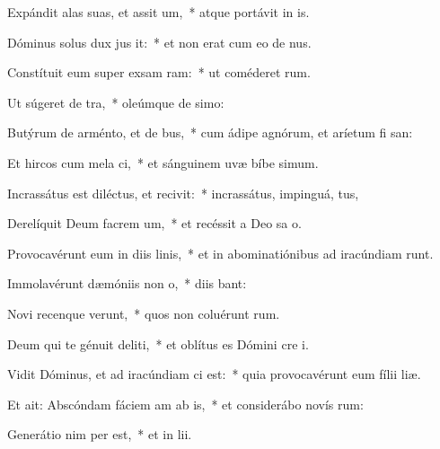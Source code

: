 \item Expándit alas suas, et assit um,~* atque portávit in  is.
\item Dóminus solus dux jus it:~* et non erat cum eo de nus.
\item Constítuit eum super exsam ram:~* ut coméderet  rum.
\item Ut súgeret  de tra,~* oleúmque de  simo:
\item Butýrum de arménto, et  de bus,~* cum ádipe agnórum, et aríetum fi san:
\item Et hircos cum mela ci,~* et sánguinem uvæ bíbe simum.
\item Incrassátus est diléctus, et recivit:~* incrassátus, impinguá, tus,
\item Derelíquit Deum facrem um,~* et recéssit a Deo sa o.
\item Provocavérunt eum in diis linis,~* et in abominatiónibus ad iracúndiam runt.
\item Immolavérunt dæmóniis  non o,~* diis  bant:
\item Novi recenque verunt,~* quos non coluérunt  rum.
\item Deum qui te génuit deliti,~* et oblítus es Dómini cre i.
\item \singlecolsep
\item Vidit Dóminus, et ad iracúndiam ci est:~* quia provocavérunt eum fílii   liæ.
\item Et ait: Abscóndam fáciem am ab is,~* et considerábo novís rum:
\item Generátio nim per est,~* et in lii.
